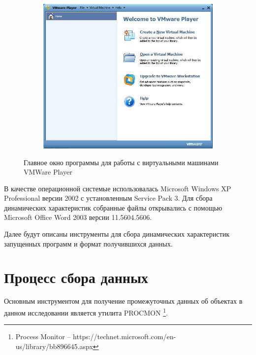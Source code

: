 \begin{figure}[ht]
	\centering
    \begin{subfigure}[b]{1\textwidth}
    \centering
        \includegraphics[scale=0.5]{vmware.jpg}        
    \end{subfigure}
 
    \caption{Главное окно программы для работы с виртуальными машинами VMWare Player}
    \label{fig_parsetree}
\end{figure}

В качестве операционной системые использовалась Microsoft Windows XP Professional версии 2002 с установленным Service Pack 3.
Для сбора динамических характеристик собранные файлы открывались с помощью Microsoft Office Word 2003 версии 11.5604.5606.

Далее будут описаны инструменты для сбора динамических характеристик запущенных программ и формат получившихся данных.

\section{Процесс сбора данных}

Основным инструментом для получение промежуточных данных об объектах в данном исследовании является утилита PROCMON \footnote{Process Monitor -- https://technet.microsoft.com/en-us/library/bb896645.aspx}.

